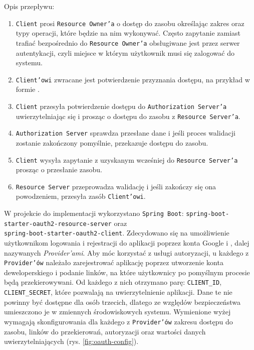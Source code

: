 Opis przepływu:
\begin{enumerate}[label=\Alph*.]
    \item \texttt{Client} prosi \texttt{Resource Owner'a} o dostęp do zasobu określając zakres oraz typy operacji, które będzie
    na nim wykonywać.
    Często zapytanie zamiast trafiać bezpośrednio do \texttt{Resource Owner'a} obsługiwane jest przez serwer autentykacji, czyli
    miejsce w którym użytkownik musi się zalogować do systemu.
    \item \texttt{Client'owi} zwracane jest potwierdzenie przyznania dostępu, na przykład w formie .
    \item \texttt{Client} przesyła potwierdzenie dostępu do \texttt{Authorization Server'a} uwierzytelniając się i prosząc
    o  dostępu do zasobu z \texttt{Resource Server'a}.
    \item \texttt{Authorization Server} sprawdza przesłane dane i jeśli proces walidacji zostanie zakończony pomyślnie,
    przekazuje  dostępu do zasobu.
    \item \texttt{Client} wysyła zapytanie z uzyskanym wcześniej  do \texttt{Resource Server'a} prosząc o przesłanie
    zasobu.
    \item \texttt{Resource Server} przeprowadza walidację  i jeśli zakończy się ona powodzeniem, przesyła zasób
    \texttt{Client'owi}.
\end{enumerate}

W projekcie do implementacji  wykorzystano  \texttt{Spring Boot}:
\newline \texttt{spring-boot-starter-oauth2-resource-server} oraz \\ \texttt{spring-boot-starter-oauth2-client}.
Zdecydowano się na umożliwienie użytkownikom logowania i rejestracji do aplikacji poprzez konta Google i ,
dalej nazywanych \emph{Provider'ami}.
Aby móc korzystać z usługi autoryzacji, u każdego z \texttt{Provider'ów} należało zarejestrować aplikację poprzez
utworzenie konta deweloperskiego i podanie linków, na które użytkownicy po pomyślnym procesie będą przekierowywani.
Od każdego z nich otrzymano parę: \texttt{CLIENT\_ID}, \texttt{CLIENT\_SECRET}, które pozwalają na uwierzytelnienie aplikacji.
Dane te nie powinny być dostępne dla osób trzecich, dlatego ze względów bezpieczeństwa umieszczono je w zmiennych
środowiskowych systemu.
Wymienione wyżej  wymagają skonfigurowania dla każdego z \texttt{Provider'ów} zakresu dostępu do zasobu, linków do
przekierowań, autoryzacji oraz wartości danych uwierzytelniających (rys. \ref{fig:oauth-config}).

